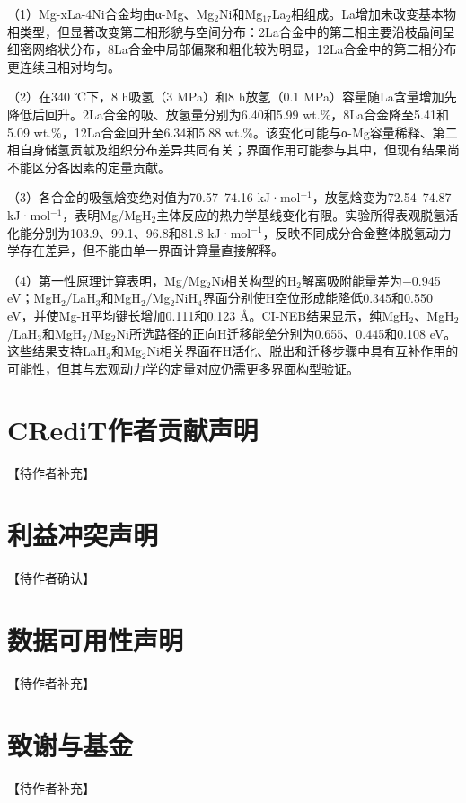 \documentclass[preprint,12pt]{elsarticle}
\begin{document}
（1）Mg-xLa-4Ni合金均由α-Mg、Mg$_{\mathrm{2}}$Ni和Mg$_{\mathrm{17}}$La$_{\mathrm{2}}$相组成。La增加未改变基本物相类型，但显著改变第二相形貌与空间分布：2La合金中的第二相主要沿枝晶间呈细密网络状分布，8La合金中局部偏聚和粗化较为明显，12La合金中的第二相分布更连续且相对均匀。

（2）在340 ℃下，8 h吸氢（3 MPa）和8 h放氢（0.1 MPa）容量随La含量增加先降低后回升。2La合金的吸、放氢量分别为6.40和5.99 wt.\%，8La合金降至5.41和5.09 wt.\%，12La合金回升至6.34和5.88 wt.\%。该变化可能与α-Mg容量稀释、第二相自身储氢贡献及组织分布差异共同有关；界面作用可能参与其中，但现有结果尚不能区分各因素的定量贡献。

（3）各合金的吸氢焓变绝对值为70.57–74.16 kJ·mol$^{-1}$，放氢焓变为72.54–74.87 kJ·mol$^{-1}$，表明Mg/MgH$_{\mathrm{2}}$主体反应的热力学基线变化有限。实验所得表观脱氢活化能分别为103.9、99.1、96.8和81.8 kJ·mol$^{-1}$，反映不同成分合金整体脱氢动力学存在差异，但不能由单一界面计算量直接解释。

（4）第一性原理计算表明，Mg/Mg$_{\mathrm{2}}$Ni相关构型的H$_{\mathrm{2}}$解离吸附能量差为−0.945 eV；MgH$_{\mathrm{2}}$/LaH$_{\mathrm{3}}$和MgH$_{\mathrm{2}}$/Mg$_{\mathrm{2}}$NiH$_{\mathrm{4}}$界面分别使H空位形成能降低0.345和0.550 eV，并使Mg-H平均键长增加0.111和0.123 Å。CI-NEB结果显示，纯MgH$_{\mathrm{2}}$、MgH$_{\mathrm{2}}$/LaH$_{\mathrm{3}}$和MgH$_{\mathrm{2}}$/Mg$_{\mathrm{2}}$Ni所选路径的正向H迁移能垒分别为0.655、0.445和0.108 eV。这些结果支持LaH$_{\mathrm{3}}$和Mg$_{\mathrm{2}}$Ni相关界面在H活化、脱出和迁移步骤中具有互补作用的可能性，但其与宏观动力学的定量对应仍需更多界面构型验证。
\clearpage
\section*{CRediT作者贡献声明}
【待作者补充】
\section*{利益冲突声明}
【待作者确认】
\section*{数据可用性声明}
【待作者补充】
\section*{致谢与基金}
【待作者补充】


\end{document}
